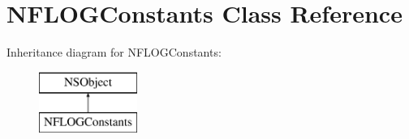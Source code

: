 \hypertarget{interface_n_f_l_o_g_constants}{}\section{N\+F\+L\+O\+G\+Constants Class Reference}
\label{interface_n_f_l_o_g_constants}
Inheritance diagram for N\+F\+L\+O\+G\+Constants\+:\begin{figure}[H]
\begin{center}
\leavevmode
\includegraphics[height=2.000000cm]{interface_n_f_l_o_g_constants}
\end{center}
\end{figure}
